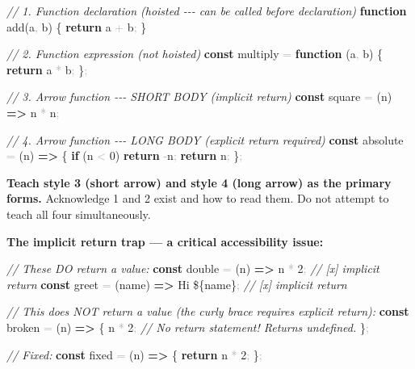 \documentclass[
  justified,
  openright,
]{tufte-book}
\newcommand{\KeywordTok}[1]{\textcolor{CodeKeyword}{\textbf{#1}}}  %
\newcommand{\StringTok}[1]{\textcolor{CodeString}{#1}}              %
\newcommand{\CommentTok}[1]{\textcolor{CodeComment}{\textit{#1}}}  %
\newcommand{\CodeNumTok}[1]{\textcolor{CodeNumber}{#1}}             %
\newcommand{\CodeFuncTok}[1]{\textcolor{CodeKeyword}{#1}}           %
\newcommand{\OperatorTok}[1]{\textcolor{DarkGray}{#1}}              %
\newenvironment{Shaded}{%
  \begin{mdframed}[style=TufteCode]%
}{%
  \end{mdframed}%
}
\begin{document}
\begin{Shaded}
\begin{Highlighting}[]
\CommentTok{// 1. Function declaration (hoisted {-}{-}{-} can be called before declaration)}
\KeywordTok{function} \CodeFuncTok{add}(a\OperatorTok{,} b) \{
  \KeywordTok{return} a \OperatorTok{+} b\OperatorTok{;}
\}
 
\CommentTok{// 2. Function expression (not hoisted)}
\KeywordTok{const} multiply \OperatorTok{=} \KeywordTok{function} (a\OperatorTok{,} b) \{
  \KeywordTok{return} a \OperatorTok{*} b\OperatorTok{;}
\}\OperatorTok{;}
 
\CommentTok{// 3. Arrow function {-}{-}{-} SHORT BODY (implicit return)}
\KeywordTok{const} square \OperatorTok{=} (n) \KeywordTok{=\textgreater{}} n \OperatorTok{*} n\OperatorTok{;}
 
\CommentTok{// 4. Arrow function {-}{-}{-} LONG BODY (explicit return required)}
\KeywordTok{const} absolute \OperatorTok{=} (n) \KeywordTok{=\textgreater{}} \{
  \KeywordTok{if} (n \OperatorTok{\textless{}} \CodeNumTok{0}) \KeywordTok{return} \OperatorTok{{-}}n\OperatorTok{;}
  \KeywordTok{return} n\OperatorTok{;}
\}\OperatorTok{;}
\end{Highlighting}
\end{Shaded}

\textbf{Teach style 3 (short arrow) and style 4 (long arrow) as the
primary forms.} Acknowledge 1 and 2 exist and how to read them. Do not
attempt to teach all four simultaneously.

\textbf{The implicit return trap --- a critical accessibility issue:}

\begin{Shaded}
\begin{Highlighting}[]
\CommentTok{// These DO return a value:}
\KeywordTok{const} double \OperatorTok{=} (n) \KeywordTok{=\textgreater{}} n \OperatorTok{*} \CodeNumTok{2}\OperatorTok{;} \CommentTok{// [x] implicit return}
\KeywordTok{const} greet \OperatorTok{=} (name) \KeywordTok{=\textgreater{}} \StringTok{\textasciigrave{}Hi }\StringTok{\$\{}name\StringTok{\}}\StringTok{\textasciigrave{}}\OperatorTok{;} \CommentTok{// [x] implicit return}
 
\CommentTok{// This does NOT return a value (the curly brace requires explicit return):}
\KeywordTok{const} broken \OperatorTok{=} (n) \KeywordTok{=\textgreater{}} \{
  n \OperatorTok{*} \CodeNumTok{2}\OperatorTok{;} \CommentTok{// No return statement! Returns undefined.}
\}\OperatorTok{;}
 
\CommentTok{// Fixed:}
\KeywordTok{const} fixed \OperatorTok{=} (n) \KeywordTok{=\textgreater{}} \{
  \KeywordTok{return} n \OperatorTok{*} \CodeNumTok{2}\OperatorTok{;}
\}\OperatorTok{;}
\end{Highlighting}
\end{Shaded}
\end{document}
